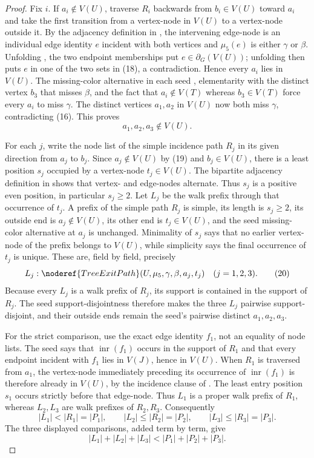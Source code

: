 \begin{proof}
Fix $i$.  If $a_i\notin V(U)$, traverse $R_i$ backwards from
$b_i\in V(U)$ toward $a_i$ and take the first transition from a
vertex-node in $V(U)$ to a vertex-node outside it.  By the adjacency
definition in , the intervening edge-node
is an individual edge identity $e$ incident with both vertices and
$\mu_5(e)$ is either $\gamma$ or $\beta$.  Unfolding
, the two endpoint memberships put
$e\in\partial_G(V(U))$; unfolding  then puts
$e$ in one of the two sets in (18), a contradiction.  Hence every
$a_i$ lies in $V(U)$.  The missing-color alternative in each seed
, elementarity with the distinct vertex $b_3$ that
misses $\beta$, and the fact that $a_i\notin V(T)$ whereas
$b_3\in V(T)$ force every $a_i$ to miss $\gamma$.  The distinct vertices
$a_1,a_2$ in $V(U)$ now both miss $\gamma$, contradicting (16).  This
proves
\[
                         a_1,a_2,a_3\notin V(U).               \tag{19}
\]

For each $j$, write the node list of the simple incidence path $R_j$ in
its given direction from $a_j$ to $b_j$.  Since $a_j\notin V(U)$ by
(19) and $b_j\in V(U)$, there is a least position $s_j$ occupied by a
vertex-node $t_j\in V(U)$.  The bipartite adjacency definition in
 shows that vertex- and edge-nodes
alternate.  Thus $s_j$ is a positive even position, in particular
$s_j\geq2$.  Let $L_j$ be the walk prefix through that occurrence of
$t_j$.  A prefix of the simple path $R_j$ is simple, its length is
$s_j\geq2$, its outside end is $a_j\notin V(U)$, its other end is
$t_j\in V(U)$, and the seed missing-color alternative at $a_j$ is
unchanged.  Minimality of $s_j$ says that no earlier vertex-node of the
prefix belongs to $V(U)$, while simplicity says the final occurrence of
$t_j$ is unique.  These are, field by field, precisely
\[
 L_j:\noderef{TreeExitPath}(U,\mu_5,\gamma,\beta,a_j,t_j)
 \quad(j=1,2,3).                                               \tag{20}
\]
Because every $L_j$ is a walk prefix of $R_j$, its support is contained
in the support of $R_j$.  The seed support-disjointness therefore makes
the three $L_j$ pairwise support-disjoint, and their outside ends remain
the seed's pairwise distinct $a_1,a_2,a_3$.

For the strict comparison, use the exact edge identity $f_1$, not an
equality of node lists.  The seed says that $\operatorname{inr}(f_1)$
occurs in the support of $R_1$ and that every endpoint incident with
$f_1$ lies in $V(J)$, hence in $V(U)$.  When $R_1$ is traversed from
$a_1$, the vertex-node immediately preceding its occurrence of
$\operatorname{inr}(f_1)$ is therefore already in $V(U)$, by the
incidence clause of .  The least entry
position $s_1$ occurs strictly before that edge-node.  Thus $L_1$ is a
proper walk prefix of $R_1$, whereas $L_2,L_3$ are walk prefixes of
$R_2,R_3$.  Consequently
\[
 |L_1|<|R_1|=|P_1|,\qquad
 |L_2|\leq|R_2|=|P_2|,\qquad
 |L_3|\leq|R_3|=|P_3|.                                       \tag{21}
\]
The three displayed comparisons, added term by term, give
\[
 |L_1|+|L_2|+|L_3|<|P_1|+|P_2|+|P_3|.                        \tag{22}
\]


\end{proof}
